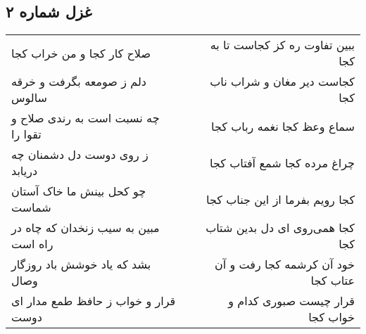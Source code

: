 \begin{center}
\section*{غزل شماره ۲}
\label{sec:sh002}
\begin{longtable}{l p{0.5cm} r}
صلاح کار کجا و من خراب کجا
&&
ببین تفاوت ره کز کجاست تا به کجا
\\
دلم ز صومعه بگرفت و خرقه سالوس
&&
کجاست دیر مغان و شراب ناب کجا
\\
چه نسبت است به رندی صلاح و تقوا را
&&
سماع وعظ کجا نغمه رباب کجا
\\
ز روی دوست دل دشمنان چه دریابد
&&
چراغ مرده کجا شمع آفتاب کجا
\\
چو کحل بینش ما خاک آستان شماست
&&
کجا رویم بفرما از این جناب کجا
\\
مبین به سیب زنخدان که چاه در راه است
&&
کجا همی‌روی ای دل بدین شتاب کجا
\\
بشد که یاد خوشش باد روزگار وصال
&&
خود آن کرشمه کجا رفت و آن عتاب کجا
\\
قرار و خواب ز حافظ طمع مدار ای دوست
&&
قرار چیست صبوری کدام و خواب کجا
\\
\end{longtable}
\end{center}

